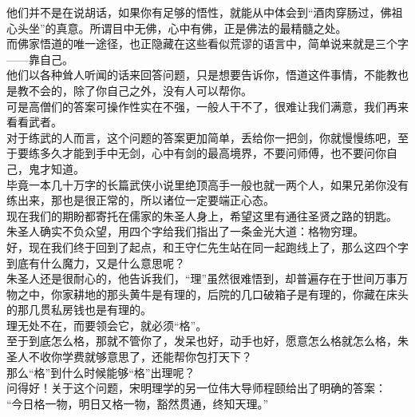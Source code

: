 \begin{multicols}{\theparacolNo}
他们并不是在说胡话，如果你有足够的悟性，就能从中体会到“酒肉穿肠过，佛祖心头坐”的真意。所谓目中无佛，心中有佛，正是佛法的最精髓之处。\\

而佛家悟道的唯一途径，也正隐藏在这些看似荒谬的语言中，简单说来就是三个字——靠自己。\\

他们以各种耸人听闻的话来回答问题，只是想要告诉你，悟道这件事情，不能教也是教不会的，除了你自己之外，没有人可以帮你。\\

可是高僧们的答案可操作性实在不强，一般人干不了，很难让我们满意，我们再来看看武者。\\

对于练武的人而言，这个问题的答案更加简单，丢给你一把剑，你就慢慢练吧，至于要练多久才能到手中无剑，心中有剑的最高境界，不要问师傅，也不要问你自己，鬼才知道。\\

毕竟一本几十万字的长篇武侠小说里绝顶高手一般也就一两个人，如果兄弟你没有练出来，那也是很正常的，所以诸位一定要端正心态。\\

现在我们的期盼都寄托在儒家的朱圣人身上，希望这里有通往圣贤之路的钥匙。\\

朱圣人确实不负众望，用四个字给我们指出了一条金光大道：格物穷理。\\

好，现在我们终于回到了起点，和王守仁先生站在同一起跑线上了，那么这四个字到底有什么魔力，又是什么意思呢？\\

朱圣人还是很耐心的，他告诉我们，“理”虽然很难悟到，却普遍存在于世间万事万物之中，你家耕地的那头黄牛是有理的，后院的几口破箱子是有理的，你藏在床头的那几贯私房钱也是有理的。\\

理无处不在，而要领会它，就必须“格”。\\

至于到底怎么格，那就不管你了，发呆也好，动手也好，愿意怎么格就怎么格，朱圣人不收你学费就够意思了，还能帮你包打天下？\\

那么“格”到什么时候能够“格”出理呢？\\

问得好！关于这个问题，宋明理学的另一位伟大导师程颐给出了明确的答案：\\

“今日格一物，明日又格一物，豁然贯通，终知天理。”\\


\end{multicols}
